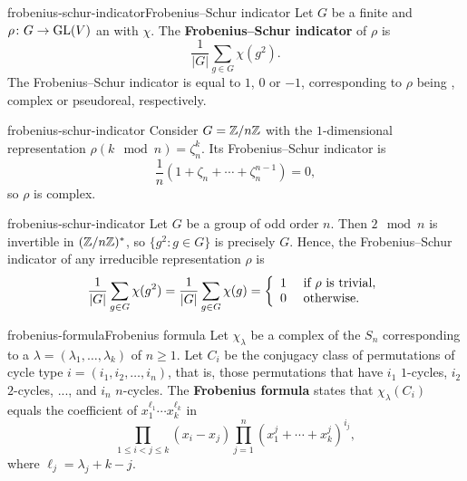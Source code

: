 

\begin{topic}{frobenius-schur-indicator}{Frobenius--Schur indicator}
    Let $G$ be a finite  and $\rho \colon G \to \textup{GL}(V)$ an  with  $\chi$. The \textbf{Frobenius--Schur indicator} of $\rho$ is
    \[ \frac{1}{|G|} \sum_{g \in G} \chi(g^2) . \]
    The Frobenius--Schur indicator is equal to $1$, $0$ or $-1$, corresponding to $\rho$ being , complex or pseudoreal, respectively.
\end{topic}

\begin{example}{frobenius-schur-indicator}
    Consider $G = \mathbb{Z}/n\mathbb{Z}$ with the $1$-dimensional representation $\rho(k \mod n) = \zeta_n^k$. Its Frobenius--Schur indicator is
    \[ \frac{1}{n} \left(1 + \zeta_n + \cdots + \zeta_n^{n - 1} \right) = 0 , \]
    so $\rho$ is complex.
\end{example}

\begin{example}{frobenius-schur-indicator}
    Let $G$ be a group of odd order $n$. Then $2 \mod n$ is invertible in $(\mathbb{Z}/n\mathbb{Z})^*$, so $\{ g^2 : g \in G \}$ is precisely $G$. Hence, the Frobenius--Schur indicator of any irreducible representation $\rho$ is
    \[ \frac{1}{|G|} \sum_{g \in G} \chi(g^2) = \frac{1}{|G|} \sum_{g \in G} \chi(g) = \left\{ \begin{array}{cl} 1 & \textup{ if $\rho$ is trivial} , \\ 0 & \textup{ otherwise} . \end{array} \right. \]
\end{example}

\begin{topic}{frobenius-formula}{Frobenius formula}
    Let $\chi_\lambda$ be a complex  of the  $S_n$ corresponding to a  $\lambda = (\lambda_1, \ldots, \lambda_k)$ of $n \ge 1$. Let $C_i$ be the conjugacy class of permutations of cycle type $i = (i_1, i_2, \ldots, i_n)$, that is, those permutations that have $i_1$ $1$-cycles, $i_2$ $2$-cycles, ..., and $i_n$ $n$-cycles. The \textbf{Frobenius formula} states that $\chi_\lambda(C_i)$ equals the coefficient of $x_1^{\ell_1} \cdots x_k^{\ell_k}$ in
    \[ \prod_{1 \le i < j \le k} (x_i - x_j) \prod_{j = 1}^{n} (x_1^j + \cdots + x_k^j)^{i_j} , \]
    where $\ell_j = \lambda_j + k - j$.
\end{topic}


